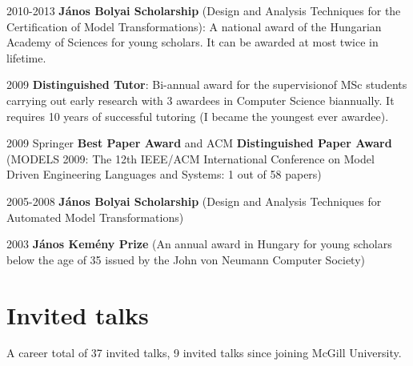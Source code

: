 \begin{yearlist}
\item[2010-2013] \textbf{J\'anos Bolyai Scholarship} (Design and Analysis Techniques for the Certification of Model Transformations): A national award of the Hungarian Academy of Sciences for young scholars. It can be awarded
at most twice in lifetime.
\item[2009] \textbf{Distinguished Tutor}: Bi-annual award for the supervisionof MSc students carrying out early research with 3 awardees in Computer Science biannually. It requires 10 years of successful tutoring (I became the youngest ever awardee). 
\item[2009] Springer \textbf{Best Paper Award} and ACM \textbf{Distinguished Paper Award} (MODELS
2009: The 12th IEEE/ACM International Conference on Model Driven Engineering Languages and Systems: 1 out of 58 papers) 
\item[2005-2008] \textbf{J\'anos Bolyai Scholarship} (Design and Analysis Techniques for Automated Model Transformations) 
\item[2003] \textbf{J\'anos Kem\'eny Prize } (An annual award in Hungary for young scholars below the age of 35 issued by the John von Neumann Computer Society)
\end{yearlist}

\section{Invited talks}

A career total of 37 invited talks, 9 invited talks since joining McGill University. 

